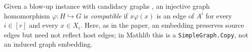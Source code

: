 \begin{definition}
Given a blow-up instance with candidacy graphs , an injective graph homomorphism $\varphi:H\hookrightarrow G$ is \emph{compatible} if $x\varphi(x)$ is an edge of $A^i$ for every $i\in[r]$ and every $x\in X_i$. Here, as in the paper, an embedding preserves source edges but need not reflect host edges; in Mathlib this is a \texttt{SimpleGraph.Copy}, not an induced graph embedding.
\end{definition}
